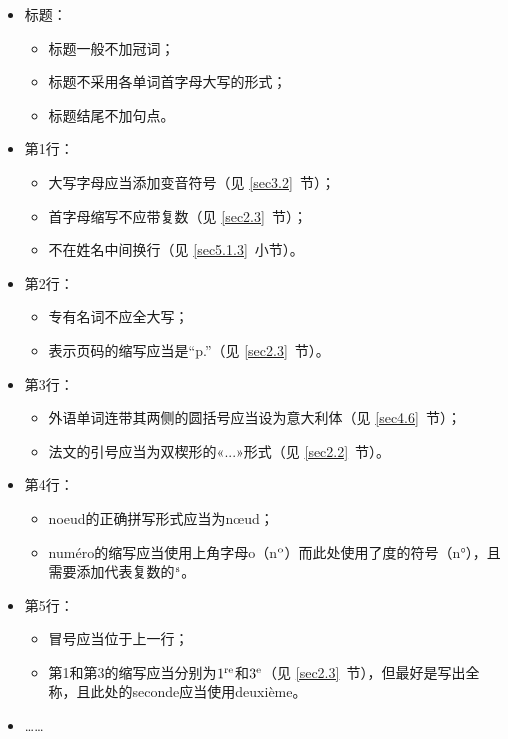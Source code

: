 \begin{itemize}
    \item 标题：
    \begin{itemize}
        \item 标题一般不加冠词；
        \item 标题不采用各单词首字母大写的形式；
        \item 标题结尾不加句点。
    \end{itemize} 
    \item 第1行：
    \begin{itemize}
        \item 大写字母应当添加变音符号（见 \ref{sec3.2}~节）；
        \item 首字母缩写不应带复数（见 \ref{sec2.3}~节）；
        \item 不在姓名中间换行（见 \ref{sec5.1.3}~小节）。
    \end{itemize}
    \item 第2行：
    \begin{itemize}
        \item 专有名词不应全大写；
        \item 表示页码的缩写应当是``p.''（见 \ref{sec2.3}~节）。
    \end{itemize}
    \item 第3行：
    \begin{itemize}
        \item 外语单词连带其两侧的圆括号应当设为意大利体（见 \ref{sec4.6}~节）；
        \item 法文的引号应当为双楔形的«...»形式（见 \ref{sec2.2}~节）。
    \end{itemize}
    \item 第4行：
    \begin{itemize}
        \item noeud的正确拼写形式应当为nœud；
        \item numéro的缩写应当使用上角字母o（n$^{\rm o}$）而此处使用了度的符号（n°），且需要添加代表复数的$^{\rm s}$。
    \end{itemize}
    \item 第5行：
    \begin{itemize}
        \item 冒号应当位于上一行；
        \item 第1和第3的缩写应当分别为$1^{\rm re}$和$3^{\rm e}$（见 \ref{sec2.3}~节），但最好是写出全称，且此处的seconde应当使用deuxième。
    \end{itemize}
    \item ……
\end{itemize}

